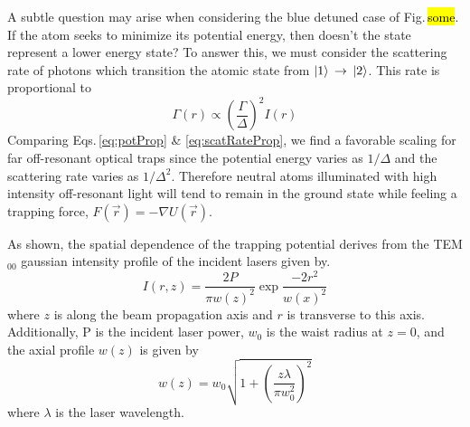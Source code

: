 A subtle question may arise when considering the blue detuned case of Fig.\,\hl{some}.
If the atom seeks to minimize its potential energy, then doesn't the state  represent a lower energy state?
To answer this, we must consider the scattering rate of photons which transition the atomic state from $\left| {1} \right>\,\rightarrow\,\left| {2} \right>$.
This rate is proportional to
\begin{equation} \label{eq:scatRateProp}
	\Gamma(r) \varpropto \left(\frac{\Gamma}{\Delta}\right)^2 I(r)
\end{equation}
Comparing Eqs.\,\ref{eq:potProp} \& \ref{eq:scatRateProp}, we find a favorable scaling for far off-resonant optical traps since the potential energy varies as $1/\Delta$ and the scattering rate varies as $1/\Delta^2$.
Therefore neutral atoms illuminated with high intensity off-resonant light will tend to remain in the ground state while feeling a trapping force, $F(\vec{r}) = -\nabla U(\vec{r})$.

As shown, the spatial dependence of the trapping potential derives from the TEM$_{00}$ gaussian intensity profile of the incident lasers given by.
\begin{equation} \label{eq:gaussInt}
	I(r,z) = \frac{2P}{\pi w(z)^2} \exp{\frac{-2 r^2}{w(x)^2}}
\end{equation}
where $z$ is along the beam propagation axis and $r$ is transverse to this axis.
Additionally, P is the incident laser power, $w_0$ is the waist radius at $z=0$, and the axial profile $w(z)$ is given by
\begin{equation}
	w(z) = w_0 \sqrt{1 + \left( \frac{z \lambda}{\pi w_0^2} \right)^2}
\end{equation}
where $\lambda$ is the laser wavelength.

